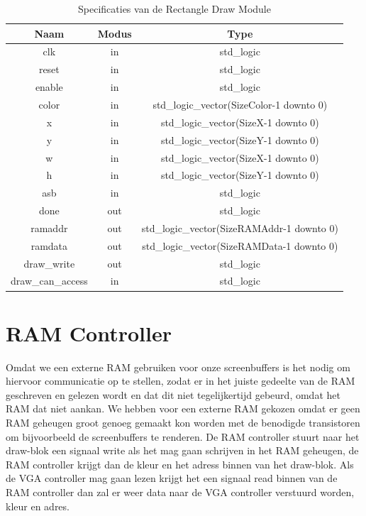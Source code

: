 \documentclass{scrreprt} %
\begin{document}
\begin{table}[H]
\centering
\caption{Specificaties van de Rectangle Draw Module}
\label{tab:spec-rect-draw}
\begin{tabular}{c c c}
	\hline\hline
 	Naam & Modus & Type\\
 	\hline	
	clk & in & std\_logic \\
	reset & in & std\_logic \\
	enable& in & std\_logic \\
	color & in & std\_logic\_vector(SizeColor-1 downto 0) \\
	x & in & std\_logic\_vector(SizeX-1 downto 0) \\
	y & in & std\_logic\_vector(SizeY-1 downto 0) \\
	w & in & std\_logic\_vector(SizeX-1 downto 0) \\
	h & in & std\_logic\_vector(SizeY-1 downto 0) \\
	asb & in & std\_logic \\
	done & out & std\_logic \\
	ramaddr &out & std\_logic\_vector(SizeRAMAddr-1 downto 0) \\
	ramdata &out & std\_logic\_vector(SizeRAMData-1 downto 0) \\
	draw\_write &out & std\_logic \\
	draw\_can\_access & in & std\_logic \\
  	\hline
\end{tabular}
\end{table}

\section{RAM Controller}
Omdat we een externe RAM gebruiken voor onze screenbuffers is het nodig om hiervoor communicatie op te stellen, zodat er in het juiste gedeelte van de RAM geschreven en gelezen wordt en dat dit niet tegelijkertijd gebeurd, omdat het RAM dat niet aankan. We hebben voor een externe RAM gekozen omdat er geen RAM geheugen groot genoeg gemaakt kon worden met de benodigde transistoren om bijvoorbeeld de screenbuffers te renderen. De RAM controller stuurt naar het draw-blok een signaal write als het mag gaan schrijven in het RAM geheugen, de RAM controller krijgt dan de kleur en het adress binnen van het draw-blok. Als de VGA controller mag gaan lezen krijgt het een signaal read binnen van de RAM controller dan zal er weer data naar de VGA controller verstuurd worden, kleur en adres.
\end{document}
